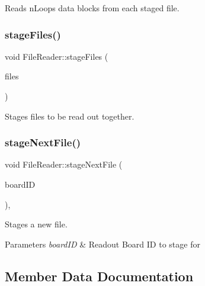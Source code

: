 Reads n\+Loops data blocks from each staged file. 

\mbox{\label{class_file_reader_a5d487d37857d537ace41c31d6594ef3a}} 
\subsubsection{\texorpdfstring{stage\+Files()}{stageFiles()}}
{\footnotesize\ttfamily void File\+Reader\+::stage\+Files (\begin{DoxyParamCaption}\item[{const std\+::vector$<$ std\+::string $>$ \&}]{files }\end{DoxyParamCaption})}



Stages files to be read out together. 

\mbox{\label{class_file_reader_ad4d5d927c5d9ceb26bba7ec1f6c60737}} 
\subsubsection{\texorpdfstring{stage\+Next\+File()}{stageNextFile()}}
{\footnotesize\ttfamily void File\+Reader\+::stage\+Next\+File (\begin{DoxyParamCaption}\item[{const \hyperlink{class_board_identifier}{Board\+Identifier} \&}]{board\+ID }\end{DoxyParamCaption})\hspace{0.3cm}{\ttfamily [inline]}, {\ttfamily [private]}}



Stages a new file. 


\begin{DoxyParams}{Parameters}
{\em board\+ID} & Readout Board ID to stage for \\
\hline
\end{DoxyParams}


\subsection{Member Data Documentation}
\mbox{\label{class_file_reader_a7a0bb5e7cb117f6a415f005665893509}} 
